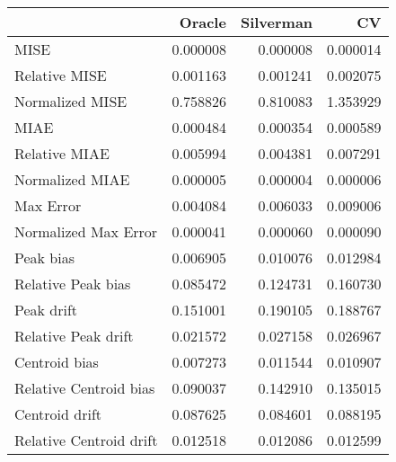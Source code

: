 \begin{tabular}{lrrr}
  \hline
 & Oracle & Silverman & CV \\ 
  \hline
MISE & 0.000008 & 0.000008 & 0.000014 \\ 
  Relative MISE & 0.001163 & 0.001241 & 0.002075 \\ 
  Normalized MISE & 0.758826 & 0.810083 & 1.353929 \\ 
  MIAE & 0.000484 & 0.000354 & 0.000589 \\ 
  Relative MIAE & 0.005994 & 0.004381 & 0.007291 \\ 
  Normalized MIAE & 0.000005 & 0.000004 & 0.000006 \\ 
  Max Error & 0.004084 & 0.006033 & 0.009006 \\ 
  Normalized Max Error & 0.000041 & 0.000060 & 0.000090 \\ 
  Peak bias & 0.006905 & 0.010076 & 0.012984 \\ 
  Relative Peak bias & 0.085472 & 0.124731 & 0.160730 \\ 
  Peak drift & 0.151001 & 0.190105 & 0.188767 \\ 
  Relative Peak drift & 0.021572 & 0.027158 & 0.026967 \\ 
  Centroid bias & 0.007273 & 0.011544 & 0.010907 \\ 
  Relative Centroid bias & 0.090037 & 0.142910 & 0.135015 \\ 
  Centroid drift & 0.087625 & 0.084601 & 0.088195 \\ 
  Relative Centroid drift & 0.012518 & 0.012086 & 0.012599 \\ 
   \hline
\end{tabular}
